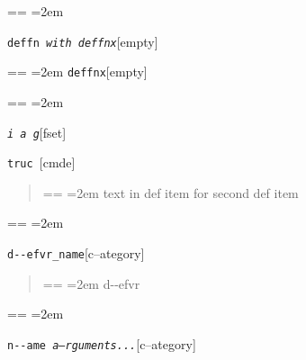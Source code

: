 \documentclass{book}
\makeatletter
\newcommand\GNUTexinfocommandstyletextvar[1]{{\normalfont{}\textsl{#1}}}%
\newenvironment{GNUTexinfopreformatted}{%
  \par\obeylines\obeyspaces\frenchspacing
  \parskip=\z@\parindent=\z@}{}
\makeatother
\begin{document}
%
\begin{GNUTexinfopreformatted}
\leftskip=2em\relax\ttfamily%

\end{GNUTexinfopreformatted}
\noindent\texttt{deffn \EmbracOn{}\textnormal{\textsl{with deffnx}}\EmbracOff{}}\hfill[empty]



%
\begin{GNUTexinfopreformatted}
\leftskip=2em\relax\ttfamily%
\end{GNUTexinfopreformatted}
\noindent\texttt{deffnx}\hfill[empty]



%
\begin{GNUTexinfopreformatted}
\leftskip=2em\relax\ttfamily%

\end{GNUTexinfopreformatted}
\noindent\texttt{\GNUTexinfocommandstyletextvar{i} \EmbracOn{}\textnormal{\textsl{a g}}\EmbracOff{}}\hfill[fset]



\index[fn]{i@\texttt{\GNUTexinfocommandstyletextvar{i}}}%
\noindent\texttt{truc \EmbracOn{}\textnormal{\textsl{}}\EmbracOff{}}\hfill[cmde]



%
\begin{quote}
\unskip{\parskip=0pt\noindent}%
\begin{GNUTexinfopreformatted}
\leftskip=2em\relax\ttfamily%
text in def item for second def item
\end{GNUTexinfopreformatted}
\end{quote}
\begin{GNUTexinfopreformatted}
\leftskip=2em\relax\ttfamily%


\end{GNUTexinfopreformatted}
\noindent\texttt{d{-}{-}efvr\_name}\hfill[c--ategory]



%
\begin{quote}
\unskip{\parskip=0pt\noindent}%
\begin{GNUTexinfopreformatted}
\leftskip=2em\relax\ttfamily%
d{-}{-}efvr
\end{GNUTexinfopreformatted}
\end{quote}
\begin{GNUTexinfopreformatted}
\leftskip=2em\relax\ttfamily%

\end{GNUTexinfopreformatted}
\noindent\texttt{n{-}{-}ame \EmbracOn{}\textnormal{\textsl{a--rguments...}}\EmbracOff{}}\hfill[c--ategory]
\end{document}
